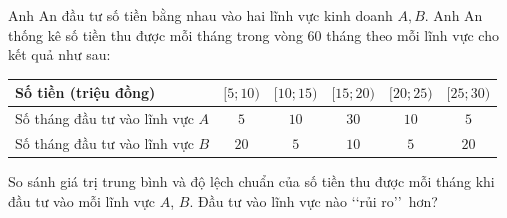 \begin{vd}%
	Anh An đầu tư số tiền bằng nhau vào hai lĩnh vực kinh doanh $A, B$. Anh An thống kê số tiền thu được mỗi tháng trong vòng $60$ tháng theo mỗi lĩnh vực cho kết quả như sau:
	\begin{center}
		\begin{tabular}{|l|c|c|c|c|c|}
			\hline Số tiền (triệu đồng) & {$[5 ; 10)$} & {$[10 ; 15)$} & {$[15 ; 20)$} & {$[20 ; 25)$} & {$[25 ; 30)$} \\
			\hline Số tháng đầu tư vào lĩnh vực $A$ & $5$ & $10$ & $30$ & $10$ & $5$ \\
			\hline Số tháng đầu tư vào lĩnh vực $B$ & $20$ & $5$ & $10$ & $5$ & $20$ \\
			\hline
		\end{tabular}
	\end{center}	
	So sánh giá trị trung bình và độ lệch chuẩn của số tiền thu được mỗi tháng khi đầu tư vào mỗi lĩnh vực $A$, $B$. Đầu tư vào lĩnh vực nào \lq\lq rủi ro\rq\rq ~hơn?
\end{vd}

